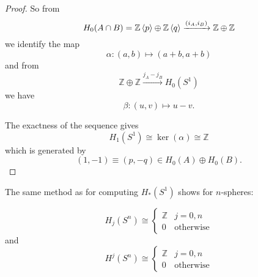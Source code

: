 \documentclass[a4paper,11pt]{article}
\begin{document}
\begin{proof}
		So from
		\[
			H_0 (A \cap B) = \mathbb{Z}\expval{p} \oplus \mathbb{Z} \expval{q} \xrightarrow{(i_A,i_B)} \mathbb{Z} \oplus \mathbb{Z}
		\]
		we identify the map
		\[
			\alpha : (a,b) \mapsto (a+b , a+b)
		\]
		and from
		\[
			\mathbb{Z} \oplus \mathbb{Z} \xrightarrow{j_A - j_B} H_0 (S^1)
		\]
		we have
		\[
			\beta : (u,v) \mapsto u-v.
		\]
		
		The exactness of the sequence gives
		\[
			H_1(S^1) \cong \ker(\alpha) \cong \mathbb{Z}
		\]
		which is generated by 
		\[
			(1,-1) \equiv (p, -q) \in H_0(A) \oplus H_0(B).
		\]
	\end{proof}


	The same method as for computing $H_*(S^1)$ shows for $n$-spheres:

	\begin{prop}
		\[
			H_j(S^n) \cong \begin{cases}
				\mathbb{Z} & j = 0,n\\
				0 & \text{otherwise}
			\end{cases}
		\]
		and
		\[
			H^j(S^n) \cong \begin{cases}
				\mathbb{Z} & j = 0,n\\
				0 & \text{otherwise}
			\end{cases}
		\]
	\end{prop}
\end{document}
